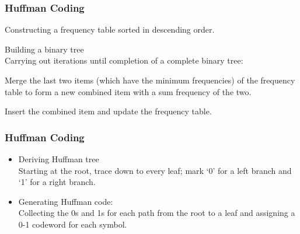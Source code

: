 \documentclass{beamer}
\begin{document}
\begin{frame}
	\Large
\frametitle{Huffman Coding}
\begin{itemize}
\item[1.] Constructing a frequency table sorted in descending order. \bigskip
\item[2.] Building a binary tree\\ 
Carrying out iterations until completion of a complete binary tree:{\Large

	\item[   (a)]   Merge the last two items (which have the minimum frequencies) of
the frequency table to form a new combined item with a sum
frequency of the two.
\item[(b)]    Insert the combined item and update the frequency table.

}
\end{itemize}
\end{frame}
\begin{frame}
	\Large
\frametitle{Huffman Coding}
\begin{itemize}
\item[3.] Deriving Huffman tree\\
Starting at the root, trace down to every leaf; mark `0' for a left branch
and `1' for a right branch.
\item[4.] Generating Huffman code:\\
Collecting the 0s and 1s for each path from the root to a leaf and
assigning a 0-1 codeword for each symbol.
\end{itemize}
\end{frame}
\begin{frame}
\end{frame}
\end{document}
